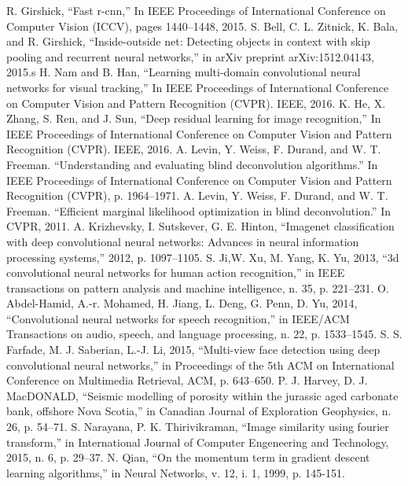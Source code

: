 \documentclass[conference,compsoc]{IEEEtran}
\begin{document}
\begin{thebibliography}{1}
		R. Girshick, ``Fast r-cnn,'' In IEEE Proceedings of International Conference on Computer Vision (ICCV), pages 1440–1448, 2015.
 			S. Bell, C. L. Zitnick, K. Bala, and R. Girshick, ``Inside-outside net: Detecting objects in context with skip pooling and recurrent neural networks,'' in arXiv preprint arXiv:1512.04143, 2015.s
			H. Nam and B. Han, ``Learning multi-domain convolutional neural networks for visual tracking,'' In IEEE Proceedings of International Conference on Computer Vision and Pattern Recognition (CVPR). IEEE, 2016.
			K. He, X. Zhang, S. Ren, and J. Sun, ``Deep residual learning for image recognition,'' In IEEE Proceedings of International Conference on Computer Vision and Pattern Recognition (CVPR). IEEE, 2016.
			A. Levin, Y. Weiss, F. Durand, and W. T. Freeman. ``Understanding and evaluating blind deconvolution algorithms.'' In IEEE Proceedings of International Conference on Computer Vision and Pattern Recognition (CVPR), p. 1964–1971.
		A. Levin, Y. Weiss, F. Durand, and W. T. Freeman. ``Efficient marginal likelihood optimization in blind deconvolution.'' In CVPR, 2011.
		A. Krizhevsky, I. Sutskever, G. E. Hinton, ``Imagenet classification with deep convolutional neural networks: Advances in neural information processing systems,'' 2012, p. 1097–1105.
			S. Ji,W. Xu, M. Yang, K. Yu, 2013, ``3d convolutional neural networks for human action recognition,'' in IEEE transactions on pattern analysis and machine intelligence, n. 35, p. 221–231.
		O. Abdel-Hamid, A.-r. Mohamed, H. Jiang, L. Deng, G. Penn, D. Yu, 2014, ``Convolutional neural networks for speech recognition,'' in IEEE/ACM Transactions on audio, speech, and language processing, n. 22, p. 1533–1545.
		S. S. Farfade, M. J. Saberian, L.-J. Li, 2015, ``Multi-view face detection using deep convolutional neural networks,'' in Proceedings of the 5th ACM on International Conference on Multimedia Retrieval, ACM, p. 643–650.
 		P. J. Harvey, D. J. MacDONALD, ``Seismic modelling of porosity within the jurassic aged carbonate bank, offshore Nova Scotia,'' in  Canadian Journal of Exploration Geophysics, n. 26, p. 54–71.
		S. Narayana, P. K. Thirivikraman, ``Image similarity using fourier transform,'' in International Journal of Computer Engeneering and Technology, 2015, n. 6, p. 29–37.
			N. Qian, ``On the momentum term in gradient descent learning algorithms,'' in Neural Networks, v. 12, i. 1, 1999, p. 145-151.

\end{thebibliography}
\end{document}
